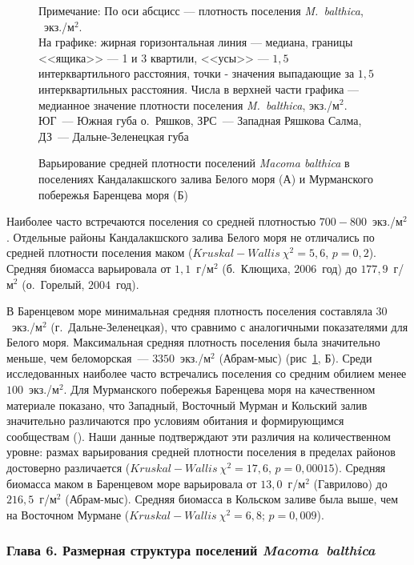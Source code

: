 {\begin{figure}[ht]
\begin{minipage}[]{.48\linewidth}
\begin{center}
	\end{center}
	\end{minipage}
	\hfill
	\caption{Варьирование средней плотности поселений {\it Macoma balthica} в поселениях Кандалакшского залива Белого моря (А) и Мурманского побережья Баренцева моря (Б)}
	{\footnotesize Примечание: По оси абсцисс --- плотность поселения {\it M.~balthica}, ~экз./м$^2$.\\
	На графике: жирная горизонтальная линия --- медиана, границы <<ящика>> --- 1 и 3 квартили, <<усы>> --- $1,5$ интерквартильного расстояния, точки - значения выпадающие за $1,5$ интерквартильных расстояния.
Числа в верхней части графика --- медианное значение плотности поселения {\it M.~balthica}, экз./м$^2$.\\
 ЮГ~--- Южная губа о.~Ряшков, ЗРС~--- Западная Ряшкова Салма, ДЗ~--- Дальне-Зеленецкая губа}
	\label{ris:N_area}
	\end{figure}

Наиболее часто встречаются поселения со средней плотностью $700-800$~экз./м$^2$.
Отдельные районы Кандалакшского залива Белого моря не отличались по средней плотности поселения маком ($Kruskal-Wallis\ \chi^2 = 5,6$, $p = 0,2$).
Средняя биомасса варьировала от $1,1$~г/м$^2$ (б.~Клющиха, $2006$~год) до $177,9$~г/м$^2$ (о.~Горелый, $2004$~год).

В Баренцевом море минимальная средняя плотность поселения составляла $30$~экз./м$^2$ (г.~Дальне-Зеленецкая), что сравнимо с аналогичными показателями для Белого моря. 
Максимальная средняя плотность поселения была значительно меньше, чем беломорская~--- $3350$~экз./м$^2$ (Абрам-мыс) (рис~\ref{ris:N_area}, Б).
Среди исследованных наиболее часто встречались поселения со средним обилием менее $100$~экз./м$^2$.
Для Мурманского побережья Баренцева моря на качественном материале показано, что Западный, Восточный Мурман и Кольский залив значительно различаются про условиям обитания и формирующимся сообществам (\cite{Guryanova_Ushakov_1929, Guryanova_et_al_1930}). 
Наши данные подтверждают эти различия на количественном уровне: размах варьирования средней плотности поселения в пределах районов достоверно различается ($Kruskal-Wallis\ \chi^2 = 17,6$, $p = 0,00015$).
Средняя биомасса маком в Баренцевом море варьировала от $13,0$~г/м$^2$ (Гаврилово) до $216,5$~г/м$^2$ (Абрам-мыс). 
Средняя биомасса в Кольском заливе была выше, чем на Восточном Мурмане ($Kruskal-Wallis~\chi^2 = 6,8$; $p = 0,009$).



\subsubsection*{Глава 6. Размерная структура поселений \textit{Macoma~balthica}}

}
